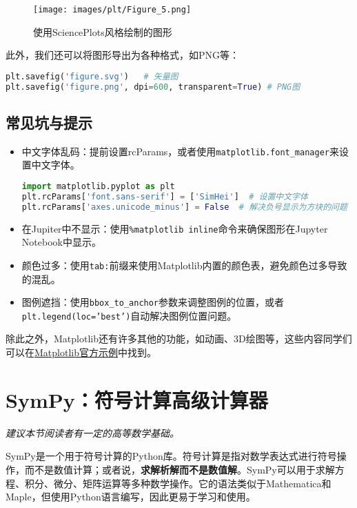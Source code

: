 \documentclass[../main.tex]{subfiles}
\begin{document}
\begin{figure}[htbp]
  \centering
  \texttt{[image: images/plt/Figure\_5.png]}
  \caption{使用SciencePlots风格绘制的图形}
\end{figure}

此外，我们还可以将图形导出为各种格式，如PNG等：
\begin{lstlisting}[language=python]
plt.savefig('figure.svg')   # 矢量图
plt.savefig('figure.png', dpi=600, transparent=True) # PNG图
\end{lstlisting}

\subsection{常见坑与提示}

\begin{itemize}
  \item 中文字体乱码：提前设置rcParams，或者使用\texttt{matplotlib.font\_manager}来设置中文字体。
    \begin{lstlisting}[language=python]
import matplotlib.pyplot as plt
plt.rcParams['font.sans-serif'] = ['SimHei']  # 设置中文字体
plt.rcParams['axes.unicode_minus'] = False  # 解决负号显示为方块的问题
    \end{lstlisting}
  \item 在Jupiter中不显示：使用\texttt{\%matplotlib inline}命令来确保图形在Jupyter Notebook中显示。
  \item 颜色过多：使用\texttt{tab:}前缀来使用Matplotlib内置的颜色表，避免颜色过多导致的混乱。
  \item 图例遮挡：使用\texttt{bbox\_to\_anchor}参数来调整图例的位置，或者\texttt{plt.legend(loc='best')}自动解决图例位置问题。
\end{itemize}

除此之外，Matplotlib还有许多其他的功能，如动画、3D绘图等，这些内容同学们可以在\href{https://matplotlib.org/stable/gallery/index.html}{Matplotlib官方示例}中找到。

\section{SymPy：符号计算高级计算器}

\begin{flushright}
  \emph{建议本节阅读者有一定的高等数学基础。}
\end{flushright}

SymPy是一个用于符号计算的Python库。符号计算是指对数学表达式进行符号操作，而不是数值计算；或者说，\textbf{求解析解而不是数值解}。SymPy可以用于求解方程、积分、微分、矩阵运算等多种数学操作。它的语法类似于Mathematica和Maple，但使用Python语言编写，因此更易于学习和使用。
\end{document}
